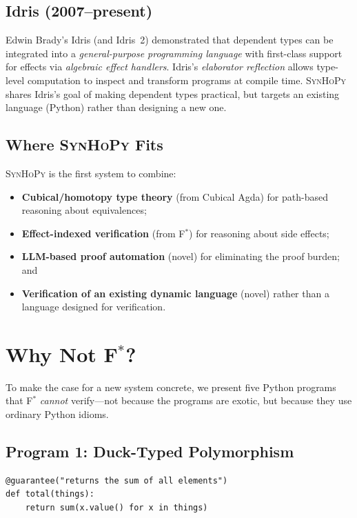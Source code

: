 \documentclass[11pt,a4paper]{report}
\theoremstyle{definition}
\theoremstyle{plain}
\newcommand{\fstar}{F$^{*}$}
\newcommand{\synhopy}{\textsc{SynHoPy}}
\begin{document}
\subsection{Idris (2007--present)}

Edwin Brady's Idris (and Idris~2) demonstrated that dependent types can
be integrated into a \emph{general-purpose programming language} with
first-class support for effects via \emph{algebraic effect handlers}.
Idris's \emph{elaborator reflection} allows type-level computation
to inspect and transform programs at compile time.  \synhopy{} shares
Idris's goal of making dependent types practical, but targets an
existing language (Python) rather than designing a new one.

\subsection{Where \synhopy{} Fits}

\synhopy{} is the first system to combine:
\begin{itemize}
  \item \textbf{Cubical/homotopy type theory} (from Cubical Agda) for
    path-based reasoning about equivalences;
  \item \textbf{Effect-indexed verification} (from \fstar{}) for reasoning
    about side effects;
  \item \textbf{LLM-based proof automation} (novel) for eliminating the
    proof burden; and
  \item \textbf{Verification of an existing dynamic language} (novel) rather
    than a language designed for verification.
\end{itemize}

\section{Why Not \fstar{}?}
\label{sec:why-not-fstar}

To make the case for a new system concrete, we present five Python programs
that \fstar{} \emph{cannot} verify---not because the programs are exotic,
but because they use ordinary Python idioms.

\subsection{Program 1: Duck-Typed Polymorphism}

\begin{lstlisting}[style=synhopy]
@guarantee("returns the sum of all elements")
def total(things):
    return sum(x.value() for x in things)
\end{lstlisting}
\end{document}
